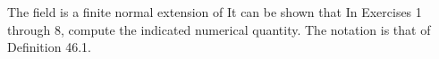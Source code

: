 \documentclass[11pt,oneside]{article}
\begin{document}
\BookNarrativefalse

\begin{BookBody}



\noindent The field  is a finite normal extension of  It can be shown that  In Exercises 1 through 8, compute the indicated numerical quantity. The notation is that of Definition 46.1.









\end{BookBody}

\BookNarrativefalse
\end{document}
